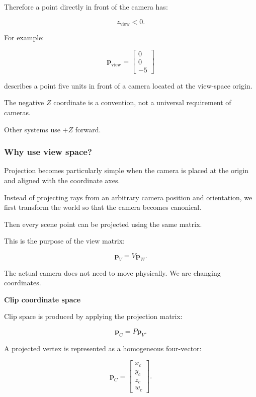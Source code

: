 Therefore a point directly in front of the camera has:

\[
 z_{\mathrm{view}}<0.
\]

For example:

\[
 \boxed{ \mathbf p_{\mathrm{view}}= \begin{bmatrix}0\\0\\-5\end{bmatrix} }
\]

describes a point five units in front of a camera located at the view-space origin.

The negative \(Z\) coordinate is a convention, not a universal requirement of cameras.

Other systems use \(+Z\) forward.

\subsubsection{Why use view space?}\label{02-foundations-ii-ch032-why-use-view-space}

\hypertarget{02-foundations-ii-ch032-why-use-view-space}{}

Projection becomes particularly simple when the camera is placed at the origin and aligned with the coordinate axes.

Instead of projecting rays from an arbitrary camera position and orientation, we first transform the world so that the camera becomes canonical.

Then every scene point can be projected using the same matrix.

This is the purpose of the view matrix:

\[
 \boxed{ \mathbf p_V=V\mathbf p_W }.
\]

The actual camera does not need to move physically. We are changing coordinates.

\textbf{Clip coordinate space}

Clip space is produced by applying the projection matrix:

\[
 \boxed{ \mathbf p_C=P\mathbf p_V }.
\]

A projected vertex is represented as a homogeneous four-vector:

\[
 \mathbf p_C= \begin{bmatrix} x_c\\y_c\\z_c\\w_c \end{bmatrix}.
\]

